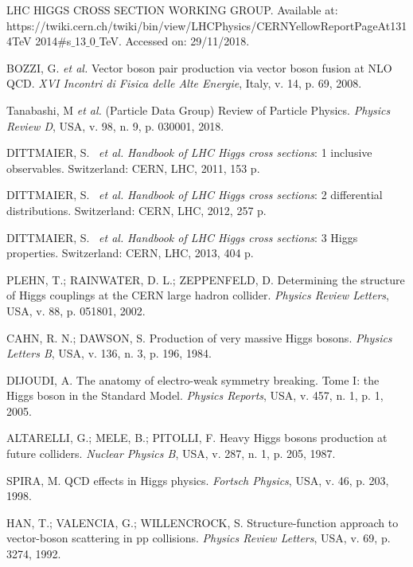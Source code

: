 \begin{thebibliography}{}
LHC HIGGS CROSS SECTION WORKING GROUP. Available at: https://twiki.cern.ch/twiki/bin/view/LHCPhysics/CERNYellowReportPageAt1314TeV 2014$\#$s$\_$13$\_$0$\_$TeV. Accessed on: 29/11/2018.

BOZZI, G. \textit{et al.} Vector boson pair production via vector boson fusion at NLO QCD. \textit{XVI Incontri di Fisica delle Alte Energie}, Italy, v. 14, p. 69, 2008.

Tanabashi, M \textit{et al.} (Particle Data Group) Review of Particle Physics. \textit{Physics Review D}, USA, v. 98, n. 9, p. 030001, 2018.

DITTMAIER, S. ~\textit{et al.} \textit{Handbook of LHC Higgs cross sections}: 1 inclusive observables. Switzerland: CERN, LHC, 2011, 153 p.

DITTMAIER, S. ~\textit{et al.} \textit{Handbook of LHC Higgs cross sections}: 2 differential distributions. Switzerland: CERN, LHC, 2012, 257 p.

DITTMAIER, S. ~\textit{et al.} \textit{Handbook of LHC Higgs cross sections}: 3 Higgs properties. Switzerland: CERN, LHC, 2013, 404 p.

PLEHN, T.; RAINWATER, D. L.; ZEPPENFELD, D. Determining the structure of Higgs couplings at the CERN large hadron collider. \textit{Physics Review Letters}, USA, v. 88, p. 051801, 2002.

CAHN, R. N.; DAWSON, S. Production of very massive Higgs bosons. \textit{Physics Letters B}, USA, v. 136, n. 3, p. 196, 1984.

DIJOUDI, A. The anatomy of electro-weak symmetry breaking. Tome I: the Higgs boson in the Standard Model. \textit{Physics Reports}, USA, v. 457, n. 1, p. 1, 2005.

ALTARELLI, G.; MELE, B.; PITOLLI, F. Heavy Higgs bosons production at future colliders. \textit{Nuclear Physics B}, USA, v. 287, n. 1, p. 205, 1987.

SPIRA, M. QCD effects in Higgs physics. \textit{Fortsch Physics}, USA, v. 46, p. 203, 1998.

HAN, T.; VALENCIA, G.; WILLENCROCK, S. Structure-function approach to vector-boson scattering in pp collisions. \textit{Physics Review Letters}, USA, v. 69, p. 3274, 1992.


\end{thebibliography}

